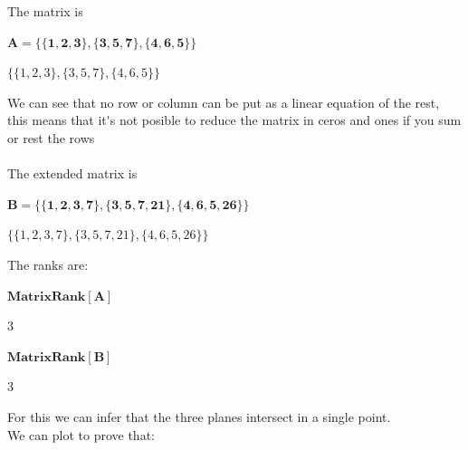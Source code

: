 \documentclass[11pt,a4paper]{article}
\begin{document}
The matrix is

\begin{doublespace}
\noindent\(\pmb{A=\{\{1,2,3\},\{3,5,7\},\{4,6,5\}\}}\)
\end{doublespace}

\begin{doublespace}
\noindent\(\{\{1,2,3\},\{3,5,7\},\{4,6,5\}\}\)
\end{doublespace}

We can see that no row or column can be put as a linear equation of the rest, this means that it\'{ }s not posible to reduce the matrix in ceros and ones if you sum or rest the rows\\
\\
The extended matrix is

\begin{doublespace}
\noindent\(\pmb{B=\{\{1,2,3,7\},\{3,5,7,21\},\{4,6,5,26\}\}}\)
\end{doublespace}

\begin{doublespace}
\noindent\(\{\{1,2,3,7\},\{3,5,7,21\},\{4,6,5,26\}\}\)
\end{doublespace}

The ranks are:

\begin{doublespace}
\noindent\(\pmb{\text{MatrixRank}[A]}\)
\end{doublespace}

\begin{doublespace}
\noindent\(3\)
\end{doublespace}

\begin{doublespace}
\noindent\(\pmb{\text{MatrixRank}[B]}\)
\end{doublespace}

\begin{doublespace}
\noindent\(3\)
\end{doublespace}

For this we can infer that the three planes intersect in a single point.\\
We can plot to prove that:

\begin{doublespace}
\noindent\(\pmb{\text{}}\)
\end{doublespace}


\end{document}
